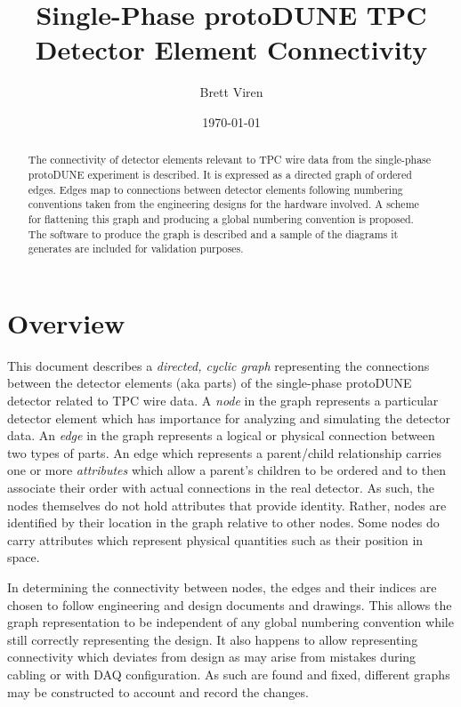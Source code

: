 \documentclass[pdftex,12pt,letter]{article}
\author{Brett Viren}
\date{\today}
\title{Single-Phase protoDUNE TPC \\ Detector Element Connectivity}
\begin{document}
\maketitle

\begin{abstract}
  \noindent The connectivity of detector elements relevant to TPC wire
  data from the single-phase protoDUNE experiment is described.  It is
  expressed as a directed graph of ordered edges.  Edges map to
  connections between detector elements following numbering conventions
  taken from the engineering designs for the hardware involved.  A
  scheme for flattening this graph and producing a global numbering
  convention is proposed.  The software to produce the graph is
  described and a sample of the diagrams it generates are included for
  validation purposes.
\end{abstract}

\tableofcontents
\newpage
\section{Overview}

This document describes a \textit{directed, cyclic graph} representing
the connections between the detector elements (aka parts) of the
single-phase protoDUNE detector related to TPC wire data.  A
\textit{node} in the graph represents a particular detector element
which has importance for analyzing and simulating the detector data.
An \textit{edge} in the graph represents a logical or physical
connection between two types of parts.  An edge which represents a
parent/child relationship carries one or more \textit{attributes}
which allow a parent's children to be ordered and to then associate
their order with actual connections in the real detector.  As such,
the nodes themselves do not hold attributes that provide identity.
Rather, nodes are identified by their location in the graph relative to
other nodes.  Some nodes do carry attributes which represent physical
quantities such as their position in space.

In determining the connectivity between nodes, the edges and their
indices are chosen to follow engineering and design documents and
drawings.  This allows the graph representation to be independent of
any global numbering convention while still correctly representing the
design.  It also happens to allow representing connectivity which
deviates from design as may arise from mistakes during cabling or with
DAQ configuration.  As such are found and fixed, different graphs may
be constructed to account and record the changes.
\end{document}
